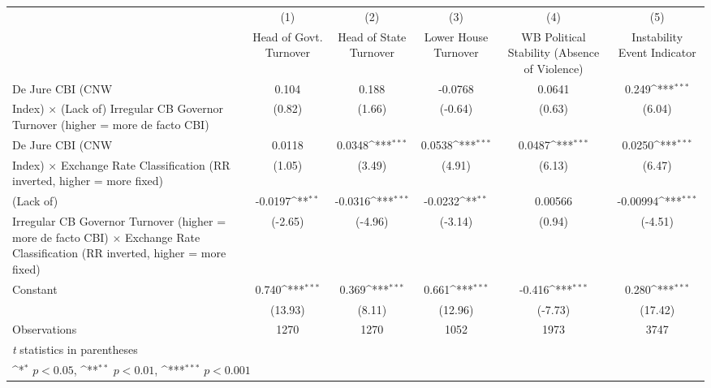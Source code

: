 {
\def\sym#1{\ifmmode^{#1}\else\(^{#1}\)\fi}
\begin{tabular}{l*{5}{c}}
\toprule
                &\multicolumn{1}{c}{(1)}&\multicolumn{1}{c}{(2)}&\multicolumn{1}{c}{(3)}&\multicolumn{1}{c}{(4)}&\multicolumn{1}{c}{(5)}\\
                &\multicolumn{1}{c}{Head of Govt. Turnover}&\multicolumn{1}{c}{Head of State Turnover}&\multicolumn{1}{c}{Lower House Turnover}&\multicolumn{1}{c}{WB Political Stability (Absence of Violence)}&\multicolumn{1}{c}{Instability Event Indicator}\\
\midrule
De Jure CBI (CNW&    0.104         &    0.188         &  -0.0768         &   0.0641         &    0.249\sym{***}\\
Index) $\times$ (Lack of) Irregular CB Governor Turnover (higher = more de facto CBI)&   (0.82)         &   (1.66)         &  (-0.64)         &   (0.63)         &   (6.04)         \\
\addlinespace
De Jure CBI (CNW&   0.0118         &   0.0348\sym{***}&   0.0538\sym{***}&   0.0487\sym{***}&   0.0250\sym{***}\\
Index) $\times$ Exchange Rate Classification (RR inverted, higher = more fixed)&   (1.05)         &   (3.49)         &   (4.91)         &   (6.13)         &   (6.47)         \\
\addlinespace
(Lack of)       &  -0.0197\sym{**} &  -0.0316\sym{***}&  -0.0232\sym{**} &  0.00566         & -0.00994\sym{***}\\
Irregular CB Governor Turnover (higher = more de facto CBI) $\times$ Exchange Rate Classification (RR inverted, higher = more fixed)&  (-2.65)         &  (-4.96)         &  (-3.14)         &   (0.94)         &  (-4.51)         \\
\addlinespace
Constant        &    0.740\sym{***}&    0.369\sym{***}&    0.661\sym{***}&   -0.416\sym{***}&    0.280\sym{***}\\
                &  (13.93)         &   (8.11)         &  (12.96)         &  (-7.73)         &  (17.42)         \\
\midrule
Observations    &     1270         &     1270         &     1052         &     1973         &     3747         \\
\bottomrule
\multicolumn{6}{l}{\footnotesize \textit{t} statistics in parentheses}\\
\multicolumn{6}{l}{\footnotesize \sym{*} \(p<0.05\), \sym{**} \(p<0.01\), \sym{***} \(p<0.001\)}\\
\end{tabular}
}
